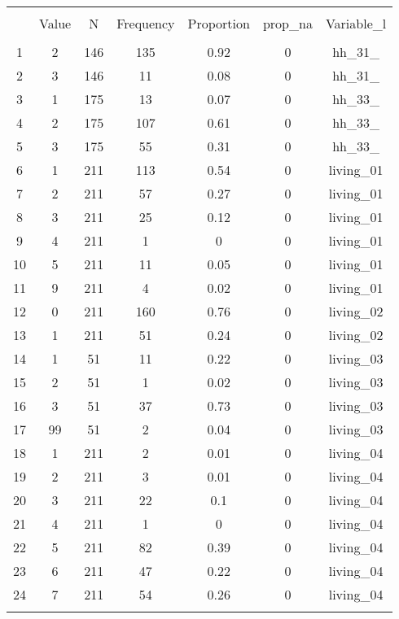 
\begin{table}[!htbp] \centering 
  \caption{} 
  \label{} 
\begin{tabular}{@{\extracolsep{5pt}} ccccccc} 
\\[-1.8ex]\hline 
\hline \\[-1.8ex] 
 & Value & N & Frequency & Proportion & prop\_na & Variable\_l \\ 
\hline \\[-1.8ex] 
1 & 2 & 146 & 135 & 0.92 & 0 & hh\_31\_ \\ 
2 & 3 & 146 & 11 & 0.08 & 0 & hh\_31\_ \\ 
3 & 1 & 175 & 13 & 0.07 & 0 & hh\_33\_ \\ 
4 & 2 & 175 & 107 & 0.61 & 0 & hh\_33\_ \\ 
5 & 3 & 175 & 55 & 0.31 & 0 & hh\_33\_ \\ 
6 & 1 & 211 & 113 & 0.54 & 0 & living\_01 \\ 
7 & 2 & 211 & 57 & 0.27 & 0 & living\_01 \\ 
8 & 3 & 211 & 25 & 0.12 & 0 & living\_01 \\ 
9 & 4 & 211 & 1 & 0 & 0 & living\_01 \\ 
10 & 5 & 211 & 11 & 0.05 & 0 & living\_01 \\ 
11 & 9 & 211 & 4 & 0.02 & 0 & living\_01 \\ 
12 & 0 & 211 & 160 & 0.76 & 0 & living\_02 \\ 
13 & 1 & 211 & 51 & 0.24 & 0 & living\_02 \\ 
14 & 1 & 51 & 11 & 0.22 & 0 & living\_03 \\ 
15 & 2 & 51 & 1 & 0.02 & 0 & living\_03 \\ 
16 & 3 & 51 & 37 & 0.73 & 0 & living\_03 \\ 
17 & 99 & 51 & 2 & 0.04 & 0 & living\_03 \\ 
18 & 1 & 211 & 2 & 0.01 & 0 & living\_04 \\ 
19 & 2 & 211 & 3 & 0.01 & 0 & living\_04 \\ 
20 & 3 & 211 & 22 & 0.1 & 0 & living\_04 \\ 
21 & 4 & 211 & 1 & 0 & 0 & living\_04 \\ 
22 & 5 & 211 & 82 & 0.39 & 0 & living\_04 \\ 
23 & 6 & 211 & 47 & 0.22 & 0 & living\_04 \\ 
24 & 7 & 211 & 54 & 0.26 & 0 & living\_04 \\ 
\hline \\[-1.8ex] 
\end{tabular} 
\end{table} 
